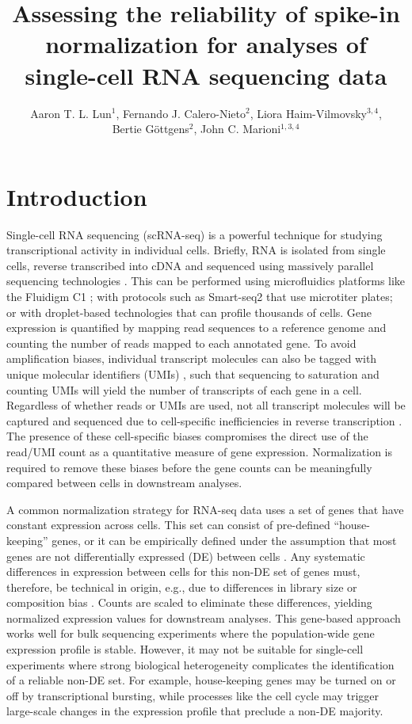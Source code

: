 \documentclass{article}
\title{Assessing the reliability of spike-in normalization for analyses of single-cell RNA sequencing data}
\author{Aaron T. L. Lun$^1$, Fernando J. Calero-Nieto$^2$, Liora Haim-Vilmovsky$^{3,4}$, \\ Bertie G\"ottgens$^2$, John C. Marioni$^{1,3,4}$}
\date{
    \begin{minipage}{0.9\textwidth}
        \begin{flushleft} 
            \begin{small}
                $^1$Cancer Research UK Cambridge Institute, University of Cambridge, Li Ka Shing Centre, Robinson Way, Cambridge CB2 0RE, United Kingdom \\
                $^2$Cambridge Institute for Medical Research,  University of Cambridge, Wellcome Trust/MRC Building, Hills Road, Cambridge CB2 0XY, United Kingdom \\
                $^3$EMBL European Bioinformatics Institute, Wellcome Genome Campus, Hinxton, Cambridge CB10 1SD, United Kingdom \\
                $^4$Wellcome Trust Sanger Institute, Wellcome Genome Campus, Hinxton, Cambridge CB10 1SA, United Kingdom \\
            \end{small}
        \end{flushleft}
    \end{minipage}\\[0.2in]
    \today{}
}
\begin{document}
\maketitle

\section{Introduction}
Single-cell RNA sequencing (scRNA-seq) is a powerful technique for studying transcriptional activity in individual cells.
Briefly, RNA is isolated from single cells, reverse transcribed into cDNA and sequenced using massively parallel sequencing technologies \cite{shapiro2013singlecell}.
This can be performed using microfluidics platforms like the Fluidigm C1 \cite{pollen2014lowcoverage}; 
    with protocols such as Smart-seq2 \cite{picelli2014full} that use microtiter plates;
    or with droplet-based technologies \cite{klein2015droplet,macosko2015highly} that can profile thousands of cells.
Gene expression is quantified by mapping read sequences to a reference genome and counting the number of reads mapped to each annotated gene.
To avoid amplification biases, individual transcript molecules can also be tagged with unique molecular identifiers (UMIs) \cite{islam2014quantitative}, such that sequencing to saturation and counting UMIs will yield the number of transcripts of each gene in a cell.
Regardless of whether reads or UMIs are used, not all transcript molecules will be captured and sequenced due to cell-specific inefficiencies in reverse transcription \cite{stegle2015computational}.
The presence of these cell-specific biases compromises the direct use of the read/UMI count as a quantitative measure of gene expression.
Normalization is required to remove these biases before the gene counts can be meaningfully compared between cells in downstream analyses.

A common normalization strategy for RNA-seq data uses a set of genes that have constant expression across cells.
This set can consist of pre-defined ``house-keeping'' genes, or it can be empirically defined under the assumption that most genes are not differentially expressed (DE) between cells \cite{lun2016pooling,anders2010differential,robinson2010tmm}.
Any systematic differences in expression between cells for this non-DE set of genes must, therefore, be technical in origin, e.g., due to differences in library size or composition bias \cite{robinson2010tmm}.
Counts are scaled to eliminate these differences, yielding normalized expression values for downstream analyses.
This gene-based approach works well for bulk sequencing experiments where the population-wide gene expression profile is stable.
However, it may not be suitable for single-cell experiments where strong biological heterogeneity complicates the identification of a reliable non-DE set. 
For example, house-keeping genes may be turned on or off by transcriptional bursting, while processes like the cell cycle may trigger large-scale changes in the expression profile that preclude a non-DE majority.
\end{document}
